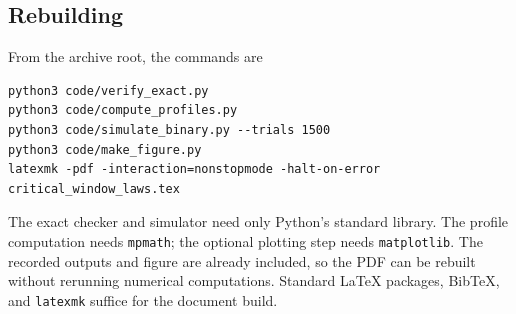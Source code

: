 \subsection{Rebuilding}
From the archive root, the commands are
\begin{verbatim}
python3 code/verify_exact.py
python3 code/compute_profiles.py
python3 code/simulate_binary.py --trials 1500
python3 code/make_figure.py
latexmk -pdf -interaction=nonstopmode -halt-on-error critical_window_laws.tex
\end{verbatim}
The exact checker and simulator need only Python's standard library.
The profile computation needs \texttt{mpmath}; the optional plotting
step needs \texttt{matplotlib}. The recorded outputs and figure are
already included, so the PDF can be rebuilt without rerunning numerical
computations. Standard LaTeX packages, BibTeX, and \texttt{latexmk}
suffice for the document build.
